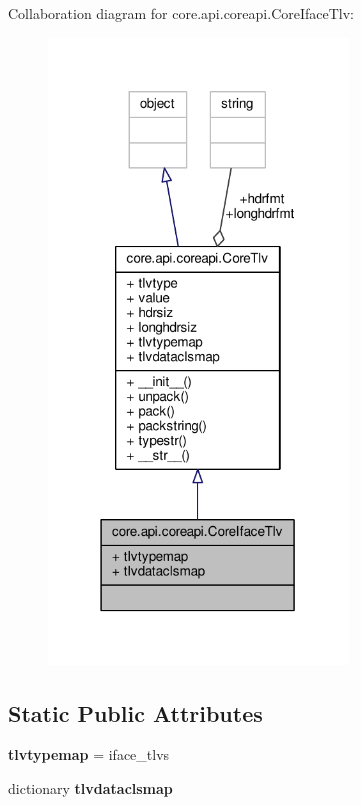 Collaboration diagram for core.\+api.\+coreapi.\+Core\+Iface\+Tlv\+:
\nopagebreak
\begin{figure}[H]
\begin{center}
\leavevmode
\includegraphics[width=226pt]{classcore_1_1api_1_1coreapi_1_1_core_iface_tlv__coll__graph}
\end{center}
\end{figure}
\subsection*{Static Public Attributes}
\begin{DoxyCompactItemize}
\item 
\hypertarget{classcore_1_1api_1_1coreapi_1_1_core_iface_tlv_a3f07d64f643d6a09fde83f7934bad0ab}{{\bfseries tlvtypemap} = iface\+\_\+tlvs}\label{classcore_1_1api_1_1coreapi_1_1_core_iface_tlv_a3f07d64f643d6a09fde83f7934bad0ab}

\item 
dictionary {\bfseries tlvdataclsmap}
\end{DoxyCompactItemize}
